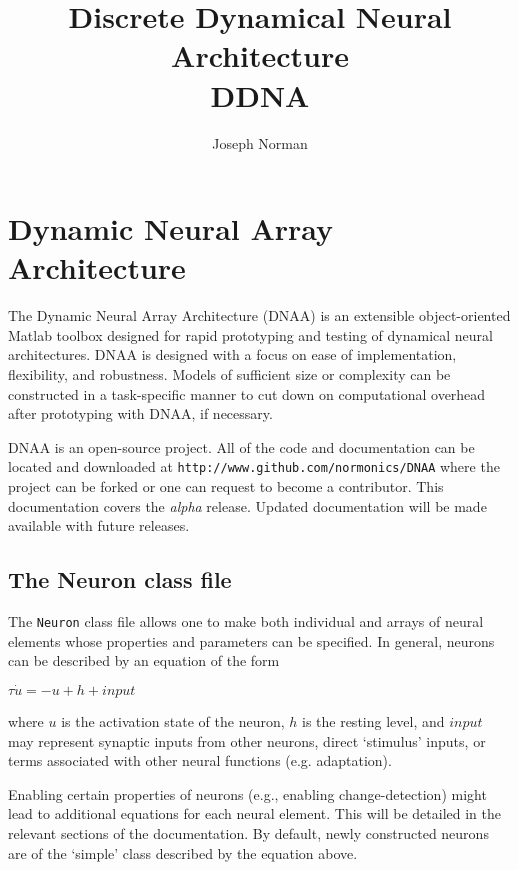 \documentclass[phd, 12pt, doublespace, online]{fauthesis}
\title{Discrete Dynamical Neural Architecture \\DDNA}
\author{Joseph Norman}
\begin{document}
\frontmatter

\maketitle
\makecopyright
\makesignature



\tableofcontents
\nolistoftables					%
\listoffigures					%

\mainmatter


\chapter{Dynamic Neural Array Architecture}

The Dynamic Neural Array Architecture (DNAA) is an extensible object-oriented Matlab toolbox designed for rapid prototyping and testing of dynamical neural architectures. DNAA is designed with a focus on ease of implementation, flexibility, and robustness. Models of sufficient size or complexity can be constructed in a task-specific manner to cut down on computational overhead after prototyping with DNAA, if necessary. 

DNAA is an open-source project. All of the code and documentation can be located and downloaded at {\tt http://www.github.com/normonics/DNAA} where the project can be forked or one can request to become a contributor. This documentation covers the \textit{alpha} release. Updated documentation will be made available with future releases. 

\section{The Neuron class file}

The {\tt Neuron} class file allows one to make both individual and arrays of neural elements whose properties and parameters can be specified. In general, neurons can be described by an equation of the form

\bigskip
\noindent $ \tau \dot{u} = -u + h + input $

\bigskip
\noindent where $u$ is the activation state of the neuron, $h$ is the resting level, and $input$ may represent synaptic inputs from other neurons, direct `stimulus' inputs, or terms associated with other neural functions (e.g. adaptation). 

Enabling certain properties of neurons (e.g., enabling change-detection) might lead to additional equations for each neural element. This will be detailed in the relevant sections of the documentation. By default, newly constructed neurons are of the `simple' class described by the equation above. 
\end{document}
